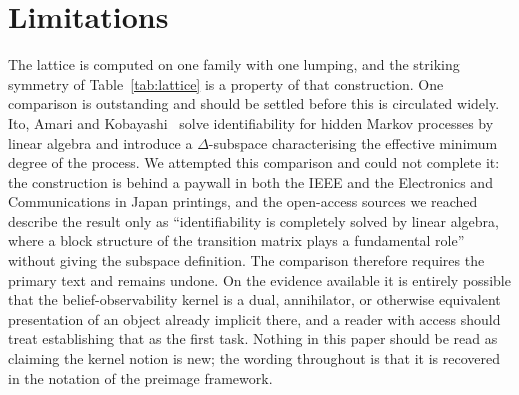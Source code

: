 \documentclass[11pt]{article}
\begin{document}
\section{Limitations}

The lattice is computed on one family with one lumping, and the striking symmetry of
Table~\ref{tab:lattice} is a property of that construction. One comparison is outstanding and should be settled before this is circulated widely. Ito,
Amari and Kobayashi~\cite{ito1992} solve identifiability for hidden Markov processes by
linear algebra and introduce a $\Delta$-subspace characterising the effective minimum
degree of the process. We attempted this comparison and could not complete it: the
construction is behind a paywall in both the IEEE and the Electronics and Communications in
Japan printings, and the open-access sources we reached describe the result only as
``identifiability is completely solved by linear algebra, where a block structure of the
transition matrix plays a fundamental role'' without giving the subspace definition. The
comparison therefore requires the primary text and remains undone. On the evidence
available it is entirely possible that the belief-observability kernel is a dual,
annihilator, or otherwise equivalent presentation of an object already implicit there, and
a reader with access should treat establishing that as the first task. Nothing in this
paper should be read as claiming the kernel notion is new; the wording throughout is that
it is recovered in the notation of the preimage framework.
\end{document}
